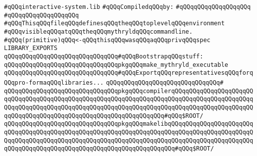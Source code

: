 \label{src/lib/core/internal/interactive-system.lib}
\verb|#qQQqinteractive-system.lib|\newline
\newline
\verb|#qQQqCompiledqQQqby:|\newline
\verb|#qQQqqQQqqQQqqQQqqQQq|\newline
\verb|#qQQqqQQqqQQqqQQqqQQq|\newline
\newline
\verb|#qQQqThisqQQqfileqQQqdefinesqQQqtheqQQqtoplevelqQQqenvironment|\newline
\verb|#qQQqvisibleqQQqatqQQqtheqQQqmythryldqQQqcommandline.|\newline
\newline
\newline
\newline
\verb|#qQQq(primitive)qQQq<-qQQqthisqQQqwasqQQqaqQQqprivqQQqspec|\newline
\newline
\verb|LIBRARY_EXPORTS|\newline
\newline
\verb|qQQqqQQqqQQqqQQqqQQqqQQqqQQqqQQq#qQQqBootstrapqQQqstuff:|\newline
\verb|qQQqqQQqqQQqqQQqqQQqqQQqqQQqqQQqpkgqQQqmake_mythryld_executable|\newline
\newline
\verb|qQQqqQQqqQQqqQQqqQQqqQQqqQQqqQQq#qQQqExportqQQqrepresentativesqQQqforqQQqpro-formaqQQqlibraries...|\newline
\verb|qQQqqQQqqQQqqQQqqQQqqQQqqQQqqQQq#|\newline
\verb|qQQqqQQqqQQqqQQqqQQqqQQqqQQqqQQqpkgqQQqcompilerqQQqqQQqqQQqqQQqqQQqqQQqqQQqqQQqqQQqqQQqqQQqqQQqqQQqqQQqqQQqqQQqqQQqqQQqqQQqqQQqqQQqqQQqqQQqqQQqqQQqqQQqqQQqqQQqqQQqqQQqqQQqqQQqqQQqqQQqqQQqqQQqqQQqqQQqqQQqqQQqqQQqqQQqqQQqqQQqqQQqqQQqqQQqqQQqqQQqqQQqqQQqqQQq#qQQq$ROOT/|\newline
\verb|qQQqqQQqqQQqqQQqqQQqqQQqqQQqqQQqpkgqQQqmakelibqQQqqQQqqQQqqQQqqQQqqQQqqQQqqQQqqQQqqQQqqQQqqQQqqQQqqQQqqQQqqQQqqQQqqQQqqQQqqQQqqQQqqQQqqQQqqQQqqQQqqQQqqQQqqQQqqQQqqQQqqQQqqQQqqQQqqQQqqQQqqQQqqQQqqQQqqQQqqQQqqQQqqQQqqQQqqQQqqQQqqQQqqQQqqQQqqQQqqQQqqQQqqQQqqQQq#qQQq$ROOT/|\newline
